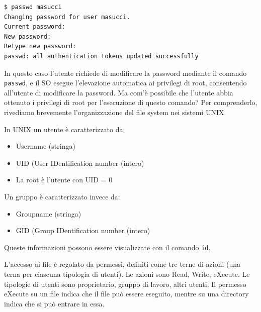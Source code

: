 \begin{mdframed}[backgroundcolor=white!20,shadow=false]

\begin{lstlisting}
$ passwd masucci
Changing password for user masucci.
Current password:
New password:
Retype new password:
passwd: all authentication tokens updated successfully
\end{lstlisting}

\end{mdframed}

In questo caso l'utente richiede di modificare la password mediante il comando \texttt{passwd}, e il SO esegue l'elevazione automatica ai privilegi di root, consentendo all'utente di modificare la password. Ma com'è possibile che l'utente abbia ottenuto i privilegi di root per l'esecuzione di questo comando? Per comprenderlo, rivediamo brevemente l'organizzazione del file system nei sistemi UNIX. 

In UNIX un utente è caratterizzato da:
\begin{itemize}
    \item Username (stringa)
    \item UID (User IDentification number (intero)
    \item La root è l'utente con UID = 0
\end{itemize}
Un gruppo è caratterizzato invece da:
\begin{itemize}
    \item Groupname (stringa)
    \item GID (Group IDentification number (intero)
\end{itemize}
Queste informazioni possono essere visualizzate con il comando \texttt{id}.

L'accesso ai file è regolato da permessi, definiti come tre terne di azioni (una terna per ciascuna tipologia di utenti). Le azioni sono Read, Write, eXecute. Le tipologie di utenti sono proprietario, gruppo di lavoro, altri utenti. Il permesso eXecute su un file indica che il file può essere eseguito, mentre su una directory indica che si può entrare in essa.

